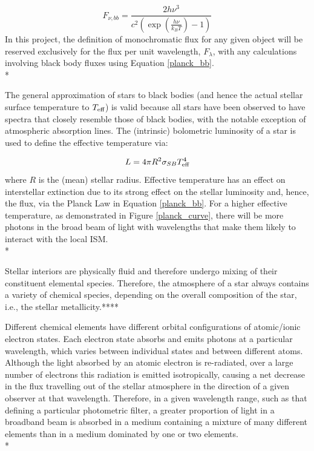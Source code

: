 \documentclass[12pt, a4paper]{report}
\begin{document}
\begin{equation}
F_{\nu,bb} = \frac{2h\nu^{3}}{c^{2}\left(\exp\left({\frac{h\nu}{k_{B}T}}\right) - 1\right)}
\label{planck_bb_freq}
\end{equation}
In this project, the definition of monochromatic flux for any given object will be reserved exclusively for the flux per unit wavelength, $F_{\lambda}$, with any calculations involving black body fluxes using Equation \ref{planck_bb}. \\*

The general approximation of stars to black bodies (and hence the actual stellar surface temperature to $T_{\textnormal{eff}}$) is valid because all stars have been observed to have spectra that closely resemble those of black bodies, with the notable exception of atmospheric absorption lines. The (intrinsic) bolometric luminosity of a star is used to define the effective temperature via:

\begin{equation}
L = 4 \pi R^{2} \sigma_{SB} T_{\textnormal{eff}}^{4}
\label{Teff_def}
\end{equation}
where $R$ is the (mean) stellar radius. Effective temperature has an effect on interstellar extinction due to its strong effect on the stellar luminosity and, hence, the flux, via the Planck Law in Equation \ref{planck_bb}. For a higher effective temperature, as demonstrated in Figure \ref{planck_curve}, there will be more photons in the broad beam of light with wavelengths that make them likely to interact with the local ISM. \\*

Stellar interiors are physically fluid and therefore undergo mixing of their constituent elemental species. Therefore, the atmosphere of a star always contains a variety of chemical species, depending on the overall composition of the star, i.e., the stellar metallicity.****

Different chemical elements have different orbital configurations of atomic/ionic electron states. Each electron state absorbs and emits photons at a particular wavelength, which varies between individual states and between different atoms. Although the light absorbed by an atomic electron is re-radiated, over a large number of electrons this radiation is emitted isotropically, causing a net decrease in the flux travelling out of the stellar atmosphere in the direction of a given observer at that wavelength. Therefore, in a given wavelength range, such as that defining a particular photometric filter, a greater proportion of light in a broadband beam is absorbed in a medium containing a mixture of many different elements than in a medium dominated by one or two elements.\\*
\end{document}
